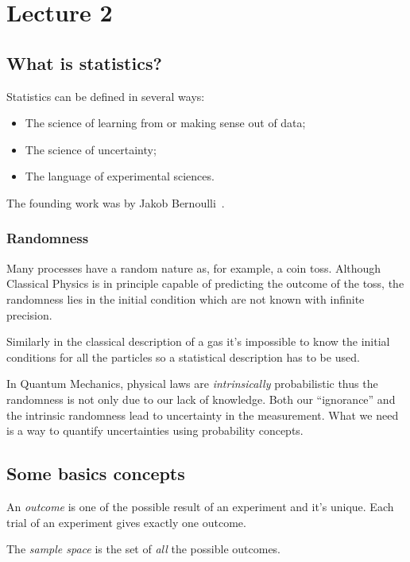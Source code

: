 \chapter{Lecture 2}
\section{What is statistics?}

Statistics can be defined in several ways:
\begin{itemize}
	\item
		The science of learning from or making sense out of data;
	\item
		The science of uncertainty;
	\item
		The language of experimental sciences.
\end{itemize}
The founding work was by Jakob Bernoulli~\cite{bernoulli}.

\subsection{Randomness}
Many processes have a random nature as, for example, a coin toss.
Although Classical Physics is in principle capable of predicting the outcome of the toss, the randomness lies in the initial condition which are not known with infinite precision. 


Similarly in the classical description of a gas it's impossible to know the initial conditions for all the particles so a statistical description has to be used.


In Quantum Mechanics, physical laws are \emph{intrinsically} probabilistic thus the randomness is not only due to our lack of knowledge.
Both our ``ignorance'' and the intrinsic randomness lead to uncertainty in the measurement.
What we need is a way to quantify uncertainties using probability concepts.


\section{Some basics concepts}

An \emph{outcome} is one of the possible result of an experiment and it's unique.
Each trial of an experiment gives exactly one outcome.


The \emph{sample space} is the set of \emph{all} the possible outcomes.



